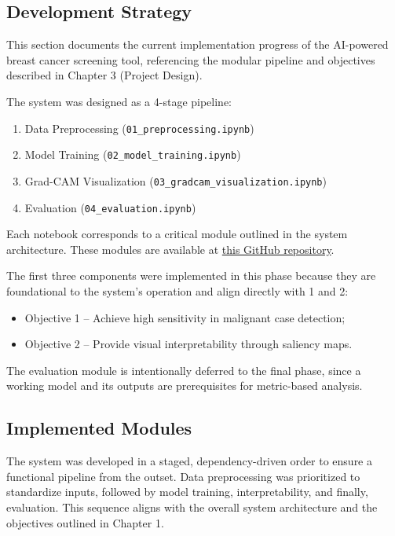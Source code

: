 \documentclass[12pt]{article}
\begin{document}
\subsection{Development Strategy}
This section documents the current implementation progress of the AI-powered breast cancer screening tool, referencing the modular pipeline and objectives described in Chapter 3 (Project Design).

The system was designed as a 4-stage pipeline:
\begin{enumerate}
    \item Data Preprocessing (\texttt{01\_preprocessing.ipynb})
    \item Model Training (\texttt{02\_model\_training.ipynb})
    \item Grad-CAM Visualization (\texttt{03\_gradcam\_visualization.ipynb})
    \item Evaluation (\texttt{04\_evaluation.ipynb})
\end{enumerate}

Each notebook corresponds to a critical module outlined in the system architecture. These modules are available at \href{https://github.com/justinlim00/FYP-Overview25/tree/main/FYP%20Project/FYP%20Project%20Code%20V1/notebooks}{this GitHub repository}.

The first three components were implemented in this phase because they are foundational to the system's operation and align directly with  1 and 2:
\begin{itemize}
    \item Objective 1 – Achieve high sensitivity in malignant case detection;
    \item Objective 2 – Provide visual interpretability through saliency maps.
\end{itemize}
The evaluation module is intentionally deferred to the final phase, since a working model and its outputs are prerequisites for metric-based analysis.

\subsection{Implemented Modules}
The system was developed in a staged, dependency-driven order to ensure a functional pipeline from the outset. Data preprocessing was prioritized to standardize inputs, followed by model training, interpretability, and finally, evaluation. This sequence aligns with the overall system architecture and the objectives outlined in Chapter 1.
\end{document}
